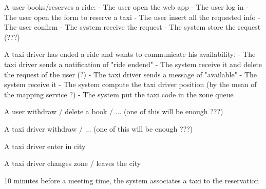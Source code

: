 A user books/reserves a ride:
- The user open the web app
- The user log in
- The user open the form to reserve a taxi
- The user insert all the requested info
- The user confirm
- The system receive the request
- The system store the request (???)

A taxi driver has ended a ride and wants to communicate his availability:
- The taxi driver sends a notification of "ride endend"
- The system receive it and delete the request of the user (?)
- The taxi driver sends a message of "available"
- The system receive it
- The system compute the taxi driver position (by the mean of the mapping service ?)
- The system put the taxi code in the zone queue

A user withdraw / delete a book / ... (one of this will be enough ???)

A taxi driver withdraw / ... (one of this will be enough ???)

A taxi driver enter in city

A taxi driver changes zone / leaves the city

10 minutes before a meeting time, the system associates a taxi to the reservation